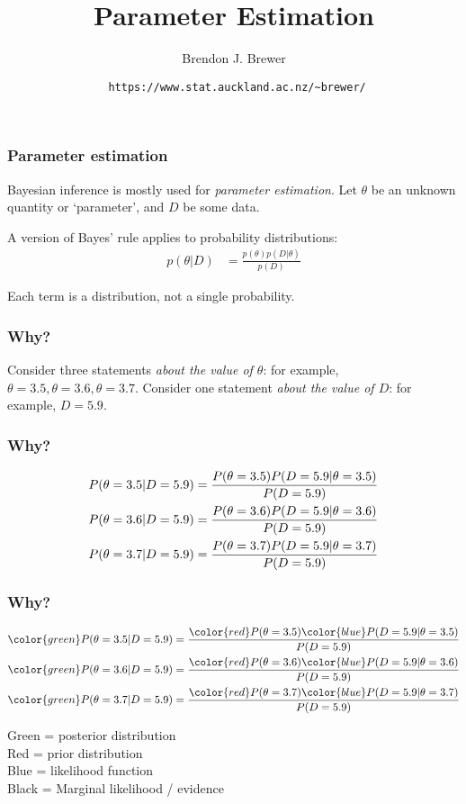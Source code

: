 \documentclass{beamer}
\title{Parameter Estimation}
\author{Brendon J. Brewer}
\institute{Department of Statistics\\
The University of Auckland}
\date{{\tt \color{blue} https://www.stat.auckland.ac.nz/\~{ }brewer/}}
\begin{document}
\frame{\titlepage}

\begin{frame}
\frametitle{Parameter estimation}

Bayesian inference is mostly used for {\em parameter estimation}.
Let $\theta$ be an unknown quantity or `parameter', and $D$ be some data.

\pause

A version of Bayes' rule applies to probability distributions:
\begin{align}
p(\theta | D) &= \frac{p(\theta)p(D|\theta)}{p(D)}
\end{align}

Each term is a distribution, not a single probability.

\end{frame}

\begin{frame}
\frametitle{Why?}
Consider three statements {\em about the value of $\theta$}: for example,
$\theta=3.5, \theta=3.6, \theta=3.7$. Consider one statement
{\em about the value of $D$}: for example, $D=5.9$.



\end{frame}


\begin{frame}
\frametitle{Why?}

\begin{align}
P(\theta=3.5 | D=5.9) &= \frac{P(\theta=3.5)P(D=5.9 | \theta=3.5)}{P(D=5.9)}\vspace{0.5em} \\
P(\theta=3.6 | D=5.9) &= \frac{P(\theta=3.6)P(D=5.9 | \theta=3.6)}{P(D=5.9)} \\
P(\theta=3.7 | D=5.9) &= \frac{P(\theta=3.7)P(D=5.9 | \theta=3.7)}{P(D=5.9)}
\end{align}

\end{frame}


\begin{frame}
\frametitle{Why?}

\begin{align}
{\color{green}P(\theta=3.5 | D=5.9)} &= \frac{{\color{red}P(\theta=3.5)}{\color{blue}P(D=5.9 | \theta=3.5)}}{P(D=5.9)}\vspace{0.5em} \\
{\color{green}P(\theta=3.6 | D=5.9)} &= \frac{{\color{red}P(\theta=3.6)}{\color{blue}P(D=5.9 | \theta=3.6)}}{P(D=5.9)} \\
{\color{green}P(\theta=3.7 | D=5.9)} &= \frac{{\color{red}P(\theta=3.7)}{\color{blue}P(D=5.9 | \theta=3.7)}}{P(D=5.9)}
\end{align}

Green = posterior distribution\\
Red = prior distribution\\
Blue = likelihood function\\
Black = Marginal likelihood / evidence

\end{frame}
\end{document}
